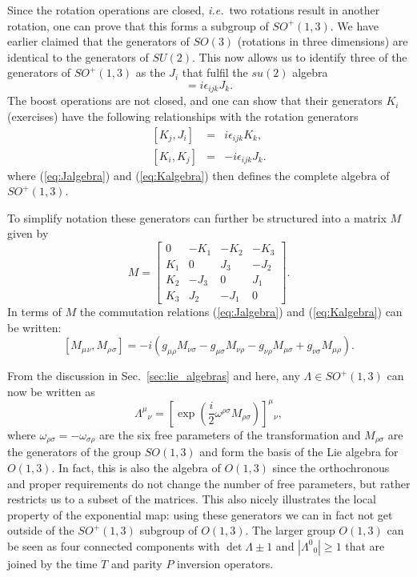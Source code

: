 \documentclass[notes.tex]{subfiles}
\begin{document}
Since the rotation operations are closed, {\it i.e.}\ two rotations result in another rotation, one can prove that this forms a subgroup of $SO^+(1,3)$. We have earlier claimed that the generators of $SO(3)$ (rotations in three dimensions) are identical to the generators of $SU(2)$. This now allows us to identify three of the generators of $SO^+(1,3)$ as the $J_i$ that fulfil the $su(2)$ algebra
\begin{equation}
[J_i,J_j]=i\epsilon_{ijk}J_k.\label{eq:Jalgebra}
\end{equation}
The boost operations are not closed, and one can show that their generators $K_i$ (exercises) have the following relationships with the rotation generators
\begin{eqnarray}
\left[K_j,J_i\right] &=& i \epsilon_{ijk}K_k,\\
\left[K_i, K_j\right] &=& -i \epsilon_{ijk}J_k.\label{eq:Kalgebra}
\end{eqnarray}
where (\ref{eq:Jalgebra}) and (\ref{eq:Kalgebra}) then defines the complete algebra of $SO^+(1,3)$.

To simplify notation these generators can further be structured into a matrix $M$ given by
\[M = \begin{bmatrix}0 & -K_1 & -K_2 & -K_3\\ K_1 & 0 & J_3 & -J_2\\ K_2 & -J_3 & 0 & J_1 \\ K_3 & J_2 & - J_1 & 0\end{bmatrix}.\]
In terms of $M$ the commutation relations (\ref{eq:Jalgebra}) and (\ref{eq:Kalgebra})  can be written:
\begin{equation}\label{eq:poco1}
[M_\mu{}_\nu, M_\rho{}_\sigma] = -i(g_{\mu\rho}M_{\nu\sigma} - g_{\mu\sigma}M_{\nu\rho} - g_{\nu\rho}M_{\mu\sigma} + g_{\nu\sigma}M_{\mu\rho}).
\end{equation}

From the discussion in Sec.~\ref{sec:lie_algebras} and here, any $\Lambda \in SO^+(1,3)$ can now be written as
\begin{equation}
\Lambda^\mu{}_\nu = \left[\exp\left(\frac{i}{2}\omega^{\rho \sigma}M_{\rho \sigma}\right)\right]^\mu{}_\nu,
\end{equation}
where $\omega_{\rho\sigma} = -\omega_{\sigma \rho}$ are the six free parameters of the transformation and $M_{\rho \sigma}$ are the generators of the group $SO(1,3)$ and form the basis of the Lie algebra for $O(1,3)$. In fact, this is also the algebra of $O(1,3)$ since the orthochronous and proper requirements do not change the number of free parameters, but rather restricts us to a subset of the matrices. This also nicely illustrates the local property of the exponential map: using these generators we can in fact not get outside of the $SO^+(1,3)$ subgroup of $O(1,3)$. The larger group $O(1,3)$ can be seen as four connected components with $\det\Lambda\pm1$ and $|\Lambda^0{}_0| \geq1$ that are joined by the time $T$ and parity $P$ inversion operators.
\end{document}
